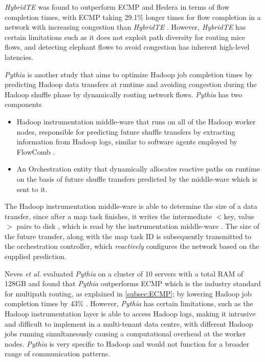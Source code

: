 \textit{HybridTE} was found to outperform ECMP \cite{hopps2000analysis} and Hedera \cite{al2010hedera} in terms of flow completion times, with ECMP taking 29.1\% longer times for flow completion in a network with increasing congestion than \textit{HybridTE} \cite{wette2015hybridte}. However, \textit{HybridTE} has certain limitations such as it does not exploit path diversity for routing mice flows, and detecting elephant flows to avoid congestion has inherent high-level latencies.  

\textit{Pythia} \cite{neves2014pythia} is another study that aims to optimize Hadoop job completion times by predicting Hadoop data transfers at runtime and avoiding congestion during the Hadoop shuffle phase by dynamically routing network flows. \textit{Pythia} has two components

\begin{itemize}
	\item Hadoop instrumentation middle-ware that runs on all of the Hadoop worker nodes, responsible for predicting future shuffle transfers by extracting information from Hadoop logs, similar to software agents employed by FlowComb \cite{das2013transparent}.
	\item An Orchestration entity that dynamically allocates reactive paths on runtime on the basis of future shuffle transfers predicted by the middle-ware which is sent to it. 
\end{itemize} 

The Hadoop instrumentation middle-ware is able to determine the size of a data transfer, since after a map task finishes, it writes the intermediate $<$key, value$>$ pairs to disk \cite{narayan2012hadoop}, which is read by the instrumentation middle-ware \cite{neves2014pythia}. The size of the future transfer, along with the map task ID is subsequently transmitted to the orchestration controller, which \textit{reactively} configures the network based on the supplied prediction.  

Neves \textit{et al.} evaluated \textit{Pythia} on a cluster of 10 servers with a total RAM of 128GB and found that \textit{Pythia} outperforms ECMP which is the industry standard for multipath routing, as explained in \ref{subsec:ECMP}; by lowering Hadoop job completion times by 43\% \cite{neves2014pythia}. However, \textit{Pythia} has certain limitations, such as the Hadoop instrumentation layer is able to access Hadoop logs, making it intrusive and difficult to implement in a multi-tenant data centre, with different Hadoop jobs running simultaneously causing a computational overhead at the worker nodes. \textit{Pythia} is very specific to Hadoop and would not function for a broader range of communication patterns. 

